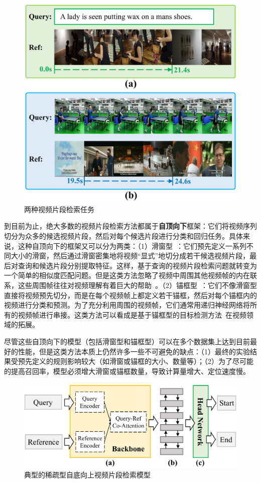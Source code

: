 \begin{figure}[htbp]
    \centering
    \includegraphics[width=0.7\linewidth]{chapter6/res/qbvl.pdf}
    \caption{两种视频片段检索任务}
    \label{ch6:fig:qbvl}
\end{figure}

到目前为止，绝大多数的视频片段检索方法都属于\textbf{自顶向下}框架：它们将视频序列切分为众多的候选视频片段，然后对每个候选片段进行分类和回归任务。具体来说，这种自顶向下的框架又可以分为两类：（1）滑窗型~\cite{gao2017tall,anne2017localizing,liu2018attentive,liu2018cross,ge2019mac,chen2019semantic,xu2019multilevel,zhang2019exploiting}：它们预先定义一系列不同大小的滑窗，然后通过滑窗密集地将视频“显式”地切分成若干候选视频片段，最后对查询和候选片段分别提取特征。这样，基于查询的视频片段检索问题就转变为一个简单的相似度匹配问题。但是这类方法忽略了视频中周围其他视频帧的内在联系，这些周围帧往往对视频理解有着巨大的帮助~\cite{wu2019long}。（2）锚框型~\cite{chen2018temporally,zhang2019man}：它们不像滑窗型直接将视频预先切分，而是在每个视频帧上都定义若干锚框，然后对每个锚框内的视频进行分类和预测。为了充分利用周围的视频帧，它们通常用递归神经网络将所有的视频帧进行串接。这类方法可以看成是基于锚框型的目标检测方法~\cite{ren2015faster}在视频领域的拓展。

尽管这些自顶向下的模型（包括滑窗型和锚框型）可以在多个数据集上达到目前最好的性能，但是这类方法本质上仍然许多一些不可避免的缺点：（1）最终的实验结果受预先定义的规则影响较大（如滑窗或锚框的大小、数量等）；（2）为了尽可能的提高召回率，模型必须增大滑窗或锚框数量，导致计算量增大、定位速度慢。


\begin{figure}[htbp]
    \centering
    \includegraphics[width=0.7\linewidth]{chapter6/res/sparse_bu.pdf}
    \caption{典型的稀疏型自底向上视频片段检索模型}
    \label{ch6:fig:sparse_bu}
\end{figure}



